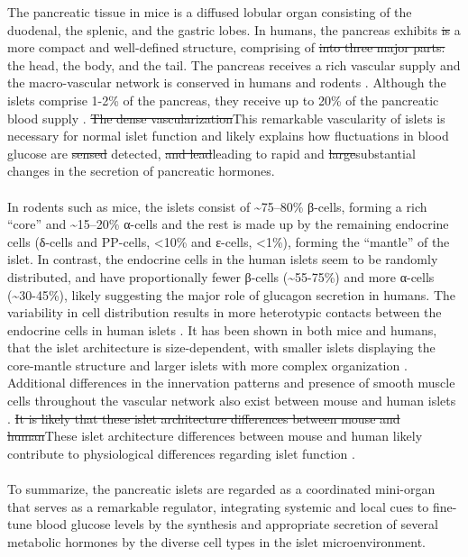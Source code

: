 The pancreatic tissue in mice is a diffused lobular organ consisting of the duodenal, the splenic, and the gastric lobes. In humans, the pancreas exhibits \st{is} a more compact and well-defined structure, comprising of \st{into three major parts:} the head, the body, and the tail. The pancreas receives a rich vascular supply and the macro-vascular network is conserved in humans and rodents \textbf{\cite{muratore_vascular_2021}}. Although the islets comprise 1-2\% of the pancreas, they receive up to 20\% of the pancreatic blood supply \textbf{\cite{muratore_vascular_2021,jansson_glucose-induced_1986}}. \st{The dense vascularization}This remarkable vascularity of islets is necessary for normal islet function and likely explains how fluctuations in blood glucose are \st{sensed} detected, \st{and lead}leading to rapid and \st{large}substantial changes in the secretion of pancreatic hormones.
\\\\
In rodents such as mice, the islets consist of \textasciitilde75–80\% β-cells, forming a rich “core” and \textasciitilde15–20\% α-cells and the rest is made up by the remaining endocrine cells (δ-cells and PP-cells, <10\% and ε-cells, <1\%), forming the “mantle” of the islet. In contrast, the endocrine cells in the human islets seem to be randomly distributed, and have proportionally fewer β-cells (\textasciitilde55-75\%) and more α-cells (\textasciitilde30-45\%), likely suggesting the major role of glucagon secretion in humans. The variability in cell distribution results in more heterotypic contacts between the endocrine cells in human islets \textbf{\cite{walker_human_2021}}. It has been shown in both mice and humans, that the islet architecture is size-dependent, with smaller islets displaying the core-mantle structure and larger islets with more complex organization \textbf{\cite{dolensek_structural_2015}}. Additional differences in the innervation patterns and presence of smooth muscle cells throughout the vascular network also exist between mouse and human islets \textbf{\cite{rodriguez-diaz_autonomic_2011}}. \st{It is likely that these islet architecture differences between mouse and human}These islet architecture differences between mouse and human likely contribute to physiological differences regarding islet function \textbf{\cite{cabrera_unique_2006}}.
\\\\
To summarize, the pancreatic islets are regarded as a coordinated mini-organ that serves as a remarkable regulator, integrating systemic and local cues to fine-tune blood glucose levels by the synthesis and appropriate secretion of several metabolic hormones by the diverse cell types in the islet microenvironment.

